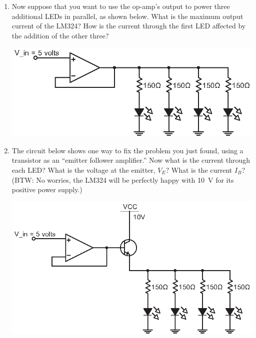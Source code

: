 \begin{enumerate}[wide]
\pagebreak[3]
\item Now suppose that you want to use the op-amp's output to power three additional LEDs in parallel, as shown below.  What is the maximum output current of the LM324?  How is the current through the first LED affected by the addition of the other three?
\begin{center}
\includegraphics{bjt/buffer_four_leds.eps}
\end{center}

\item The circuit below shows one way to fix the problem you just found, using a transistor as an ``emitter follower amplifier.''  Now what is the current through each LED?  What is the voltage at the emitter, $V_E$?  What is the current $I_B$?  (BTW: No worries, the LM324 will be perfectly happy with 10~V for its positive power supply.)
\begin{center}
\includegraphics{bjt/emitter_follower1.eps}
\end{center}


\end{enumerate}
